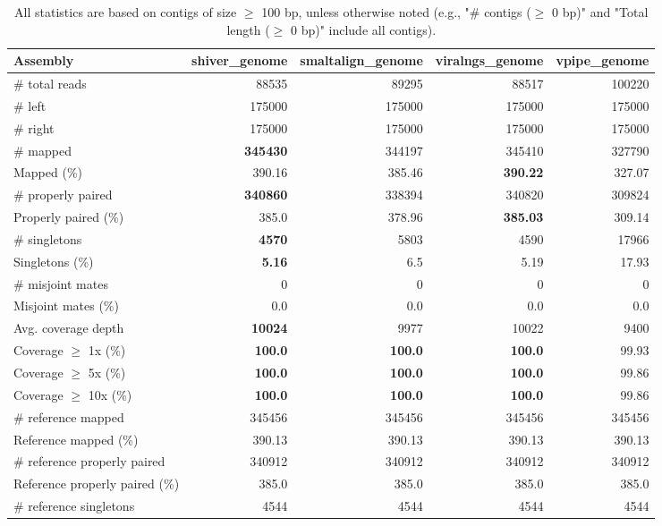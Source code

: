 \documentclass[12pt,a4paper]{article}
\begin{document}
\begin{table}[ht]
\begin{center}
\caption{All statistics are based on contigs of size $\geq$ 100 bp, unless otherwise noted (e.g., "\# contigs ($\geq$ 0 bp)" and "Total length ($\geq$ 0 bp)" include all contigs).}
\begin{tabular}{|l*{4}{|r}|}
\hline
Assembly & shiver\_genome & smaltalign\_genome & viralngs\_genome & vpipe\_genome \\ \hline
\# total reads & 88535 & 89295 & 88517 & 100220 \\ \hline
\# left & 175000 & 175000 & 175000 & 175000 \\ \hline
\# right & 175000 & 175000 & 175000 & 175000 \\ \hline
\# mapped & {\bf 345430} & 344197 & 345410 & 327790 \\ \hline
Mapped (\%) & 390.16 & 385.46 & {\bf 390.22} & 327.07 \\ \hline
\# properly paired & {\bf 340860} & 338394 & 340820 & 309824 \\ \hline
Properly paired (\%) & 385.0 & 378.96 & {\bf 385.03} & 309.14 \\ \hline
\# singletons & {\bf 4570} & 5803 & 4590 & 17966 \\ \hline
Singletons (\%) & {\bf 5.16} & 6.5 & 5.19 & 17.93 \\ \hline
\# misjoint mates & 0 & 0 & 0 & 0 \\ \hline
Misjoint mates (\%) & 0.0 & 0.0 & 0.0 & 0.0 \\ \hline
Avg. coverage depth & {\bf 10024} & 9977 & 10022 & 9400 \\ \hline
Coverage $\geq$ 1x (\%) & {\bf 100.0} & {\bf 100.0} & {\bf 100.0} & 99.93 \\ \hline
Coverage $\geq$ 5x (\%) & {\bf 100.0} & {\bf 100.0} & {\bf 100.0} & 99.86 \\ \hline
Coverage $\geq$ 10x (\%) & {\bf 100.0} & {\bf 100.0} & {\bf 100.0} & 99.86 \\ \hline
\# reference mapped & 345456 & 345456 & 345456 & 345456 \\ \hline
Reference mapped (\%) & 390.13 & 390.13 & 390.13 & 390.13 \\ \hline
\# reference properly paired & 340912 & 340912 & 340912 & 340912 \\ \hline
Reference properly paired (\%) & 385.0 & 385.0 & 385.0 & 385.0 \\ \hline
\# reference singletons & 4544 & 4544 & 4544 & 4544 \\ \hline

\end{tabular}
\end{center}
\end{table}
\end{document}
